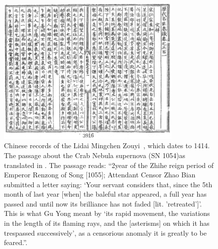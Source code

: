 \begin{figure}[h]
  \centering
  \includegraphics[width=0.8\textwidth]{figures/sn1054_chinese.png}
  \caption[Historical Chinese records about the Crab supernova]{Chinese records of the Lidai Mingchen Zouyi~\cite[535]{chinese_history}, which dates to 1414.
    The passage about the Crab Nebula supernova (SN 1054)as translated in \cite{crab_chinese}. 
    The passage reads: \enquote{2\nd year of the Zhihe reign period of Emperor Renzong of 
    Song [1055]; Attendant Censor Zhao Bian submitted a letter saying: \enquote{Your servant considers that, since the 5th month of last
    year [when] the baleful star appeared, a full year has passed and until now its brilliance has not faded [lit. 'retreated']}. 
    This is what Gu Yong meant by \enquote{its rapid movement, the variations in the length of its flaming rays, and the [asterisms] on which
    it has trespassed successively}, as a censorious anomaly it is greatly to be feared.}.
    }\label{fig:crab_chinese}
\end{figure}


